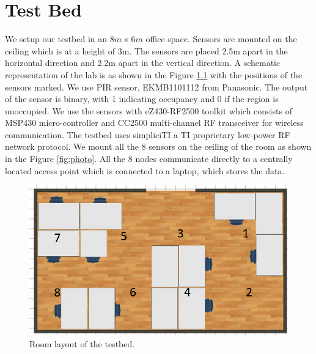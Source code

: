 \chapter{Test Bed}
\label{chp:testbed}
We setup our testbed in an $8m\times6m$ office space. Sensors are mounted on the ceiling which is at a height of 3m. The sensors are  placed 2.5m apart in the horizontal direction and 2.2m apart in the vertical direction. A schematic representation of the lab is as shown in the Figure \ref{fig:roomLayout} with the positions of the sensors marked. We use  PIR sensor, EKMB1101112 from Panasonic. 
The output of the sensor is binary, with 1 indicating occupancy and 0 if the region is unoccupied.  We use the sensors with eZ430-RF2500 toolkit which consists of MSP430 micro-controller  and CC2500 multi-channel
RF transceiver for wireless communication. The testbed uses simpliciTI a TI proprietary  low-power RF network protocol.  We mount all the 8 sensors on the ceiling of the room as shown in the Figure \ref{fig:photo}. 
All the 8 nodes communicate directly to a centrally located access point which is connected to a laptop, which stores the data.

\begin{figure}[!ht]
\centering
\includegraphics[scale=0.5]{./pics/roomLayout.png}
\caption{Room layout of the testbed.}
\label{fig:roomLayout}
\end{figure}


